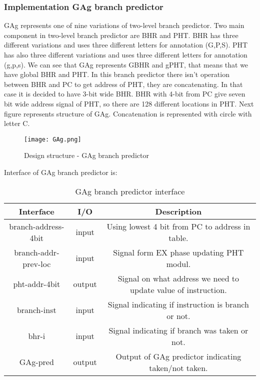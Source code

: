 \documentclass{scrreprt}
\begin{document}
\subsubsection*{Implementation GAg branch predictor}
GAg represents one of nine variations of two-level branch predictor. Two main component in two-level branch predictor are BHR and PHT. BHR has three different variations and uses three different letters for annotation (G,P,S). PHT has also three different variations and uses three different letters for annotation (g,p,s). We can see that GAg represents GBHR and gPHT, that means that we have global BHR and PHT. 
In this branch predictor there isn't operation between BHR and PC to get address of PHT, they are concatenating. In that case it is decided to have 3-bit wide BHR. BHR with 4-bit from PC give seven bit wide address signal of PHT, so there are 128 different locations in PHT. 
Next figure represents structure of GAg. Concatenation is represented with circle with letter C. 
\begin{figure}[htb!]
    \centering
    \texttt{[image: GAg.png]}
    \caption{Design structure - GAg branch predictor}
    \label{fig:GAg}
\end{figure}
\newline
\newline
\newline
\newline
\newline
\newline
Interface of GAg branch predictor is:
\begin{table}[htb!]
            \centering
            \begin{tabular}{|c|c|c|} \hline 
             Interface & I/O & Description \\ \hline  
             branch-address-4bit & input & Using lowest 4 bit from PC to address in table. \\ \hline 
             branch-addr-prev-loc & input & Signal form EX phase updating PHT modul.  \\ \hline
             pht-addr-4bit & output & Signal on what address we need to update value of instruction.  \\ \hline
             branch-inst & input & Signal indicating if instruction is branch or not.  \\ \hline
             bhr-i & input & Signal indicating if branch was taken or not.  \\ \hline
             GAg-pred & output & Output of GAg predictor indicating taken/not taken.  \\ \hline
        \end{tabular}
        \caption{GAg branch predictor interface}
        \label{tab:GAgI}
    \end{table}
\end{document}
